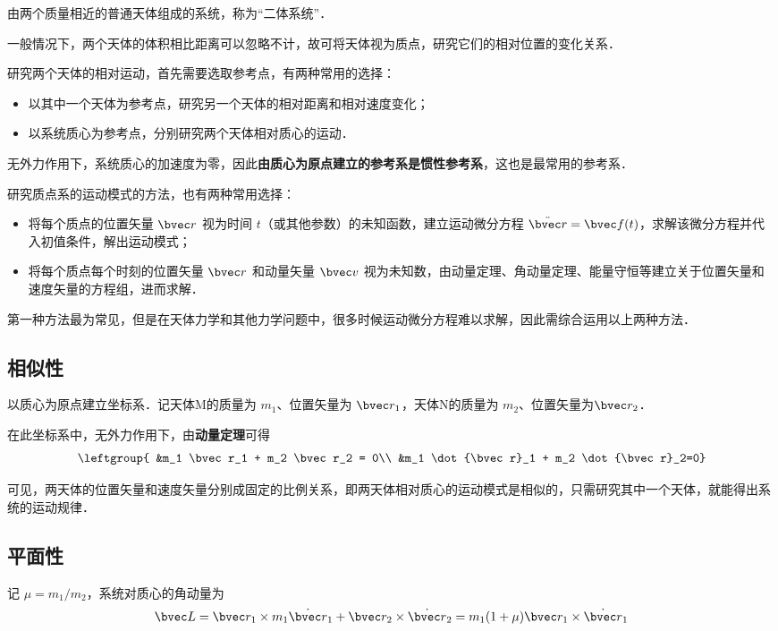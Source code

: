 

由两个质量相近的普通天体组成的系统，称为“二体系统”．

一般情况下，两个天体的体积相比距离可以忽略不计，故可将天体视为质点，研究它们的相对位置的变化关系．

研究两个天体的相对运动，首先需要选取参考点，有两种常用的选择：
\begin{itemize}
\item 以其中一个天体为参考点，研究另一个天体的相对距离和相对速度变化；
\item 以系统质心为参考点，分别研究两个天体相对质心的运动．
\end{itemize}

无外力作用下，系统质心的加速度为零，因此\textbf{由质心为原点建立的参考系是惯性参考系}，这也是最常用的参考系．

研究质点系的运动模式的方法，也有两种常用选择：
\begin{itemize}
\item 将每个质点的位置矢量 $\bvec r$ 视为时间 $t$（或其他参数）的未知函数，建立运动微分方程 $\ddot{\bvec r}= \bvec f (t)$，求解该微分方程并代入初值条件，解出运动模式；
\item 将每个质点每个时刻的位置矢量 $\bvec r$ 和动量矢量 $\bvec v$ 视为未知数，由动量定理、角动量定理、能量守恒等建立关于位置矢量和速度矢量的方程组，进而求解．
\end{itemize}
第一种方法最为常见，但是在天体力学和其他力学问题中，很多时候运动微分方程难以求解，因此需综合运用以上两种方法．

\subsection{相似性}
以质心为原点建立坐标系．记天体M的质量为 $m_1$、位置矢量为 $\bvec r_1$，天体N的质量为 $m_2$、位置矢量为$\bvec r_2$．

在此坐标系中，无外力作用下，由\textbf{动量定理}可得
\begin{equation}
\leftgroup{
&m_1 \bvec r_1 + m_2 \bvec r_2 = 0\\
&m_1 \dot{\bvec r}_1 + m_2 \dot{\bvec r}_2=0}
\end{equation}

可见，两天体的位置矢量和速度矢量分别成固定的比例关系，即两天体相对质心的运动模式是相似的，只需研究其中一个天体，就能得出系统的运动规律．

\subsection{平面性}
 记 $\mu=m_1/m_2$，系统对质心的角动量为
\begin{equation}
\bvec L =\bvec r_1 \times m_1 \dot{\bvec r}_1+ \bvec r_2 \times \dot{\bvec r}_2 = m_1 (1+\mu)\bvec r_1 \times \dot{\bvec r}_1
\end{equation}

